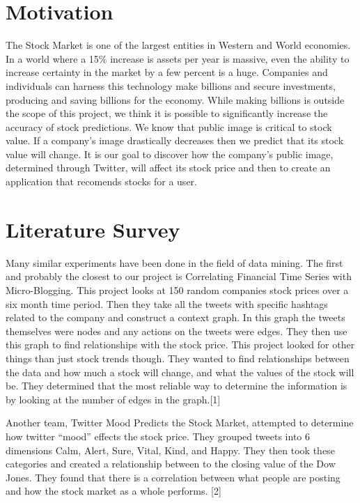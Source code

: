 \documentclass{acm_proc_article-sp}
\begin{document}
\section{Motivation}

The Stock Market is one of the largest entities in Western and World economies.
In a world where a 15\% increase is assets per year is massive,  even the
ability to increase certainty in the market by a few percent is a huge.
Companies and individuals can harness this technology make billions and secure
investments, producing and saving billions for the economy. While making
billions is outside the scope of this project, we think it is possible to
significantly increase the accuracy of stock predictions. We know that public
image is critical to stock value. If a company's image drastically decreases
then we predict that its stock value will change. It is our goal to discover
how the company's public image, determined through Twitter, will affect its
stock price and then to create an application that recomends stocks for a user.

\section{Literature Survey}

Many similar experiments have been done in the
field of data mining. The first and probably the closest to our project is
Correlating Financial Time Series with Micro-Blogging. This project looks at
150 random companies stock prices over a six month time period. Then they take
all the tweets with specific hashtags related to the company and construct a
context graph. In this graph the tweets themselves were nodes and any actions
on the tweets were edges. They then use this graph to find relationships with
the stock price. This project looked for other things than just stock trends
though. They wanted to find relationships between the data and how much a stock
will change, and what the values of the stock will be. They determined that the
most reliable way to determine the information is by looking at the number of
edges in the graph.[1] 

Another team, Twitter Mood Predicts the Stock Market, attempted to determine
how twitter “mood” effects the stock price. They grouped tweets into 6
dimensions Calm, Alert, Sure, Vital, Kind, and Happy. They then took these
categories and created a relationship between to the closing value of the Dow
Jones. They found that there is a correlation between what people are posting
and how the stock market as a whole performs. [2] 
\end{document}
